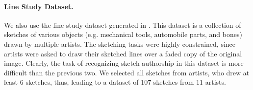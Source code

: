 









\vspace{-2mm}
\paragraph{Line Study Dataset.} We also use the line study dataset generated in \cite{Cole:2008:PDL:1360612.1360687}. This dataset is a collection of sketches of various objects (e.g. mechanical tools, automobile parts, and bones) drawn by multiple artists. The sketching tasks were highly constrained, since artists were asked to draw their sketched lines over a faded copy of the original image. Clearly, the task of recognizing sketch authorship in this dataset is more difficult than the previous two. We selected all sketches from artists, who drew at least 6 sketches, thus, leading to a dataset of 107 sketches from 11 artists.  %

